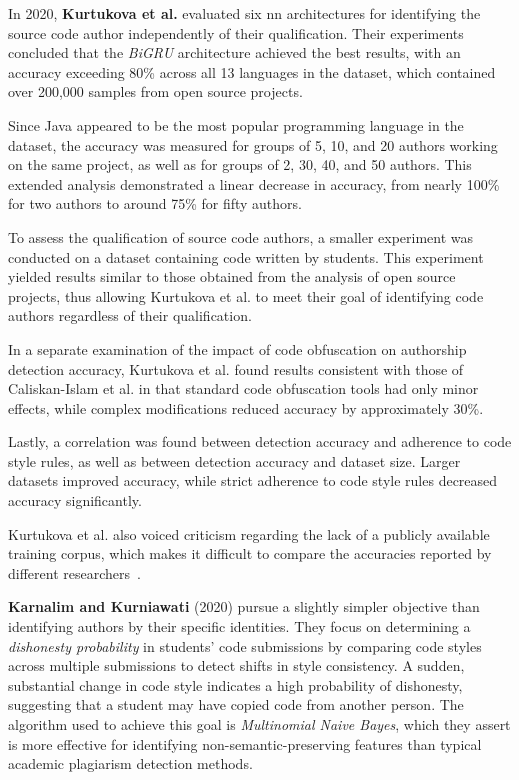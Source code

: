 In 2020, \textbf{Kurtukova et al.} evaluated six \ac{nn} architectures for identifying the source code author independently of their qualification.
Their experiments concluded that the \textit{BiGRU} architecture achieved the best results, with an accuracy exceeding 80\% across all 13 languages in the dataset, which contained over 200,000 samples from open source projects.

Since Java appeared to be the most popular programming language in the dataset, the accuracy was measured for groups of 5, 10, and 20 authors working on the same project, as well as for groups of 2, 30, 40, and 50 authors.
This extended analysis demonstrated a linear decrease in accuracy, from nearly 100\% for two authors to around 75\% for fifty authors.

To assess the qualification of source code authors, a smaller experiment was conducted on a dataset containing code written by students.
This experiment yielded results similar to those obtained from the analysis of open source projects, thus allowing Kurtukova et al. to meet their goal of identifying code authors regardless of their qualification.

In a separate examination of the impact of code obfuscation on authorship detection accuracy, Kurtukova et al. found results consistent with those of Caliskan-Islam et al. in that standard code obfuscation tools had only minor effects, while complex modifications reduced accuracy by approximately 30\%.

Lastly, a correlation was found between detection accuracy and adherence to code style rules, as well as between detection accuracy and dataset size.
Larger datasets improved accuracy, while strict adherence to code style rules decreased accuracy significantly.

Kurtukova et al. also voiced criticism regarding the lack of a publicly available training corpus, which makes it difficult to compare the accuracies reported by different researchers~\cite{Kurtukova2020}.

\textbf{Karnalim and Kurniawati} (2020) pursue a slightly simpler objective than identifying authors by their specific identities.
They focus on determining a \textit{dishonesty probability} in students' code submissions by comparing code styles across multiple submissions to detect shifts in style consistency.
A sudden, substantial change in code style indicates a high probability of dishonesty, suggesting that a student may have copied code from another person.
The algorithm used to achieve this goal is \textit{Multinomial Naive Bayes}, which they assert is more effective for identifying non-semantic-preserving features than typical academic plagiarism detection methods.

